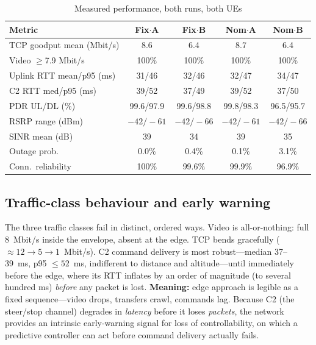 \documentclass[10pt, conference]{IEEEtran}
\begin{document}
\begin{table}[t]
\caption{Measured performance, both runs, both UEs}
\label{tab:metrics}
\centering
\footnotesize
\begin{tabular}{|l|c|c|c|c|}
\hline
\textbf{Metric} & \textbf{Fix$\cdot$A} & \textbf{Fix$\cdot$B} & \textbf{Nom$\cdot$A} & \textbf{Nom$\cdot$B} \\
\hline
TCP goodput mean (Mbit/s) & 8.6 & 6.4 & 8.7 & 6.4 \\
\hline
Video $\ge$7.9 Mbit/s & 100\% & 100\% & 100\% & 100\% \\
\hline
Uplink RTT mean/p95 (ms) & 31/46 & 32/46 & 32/47 & 34/47 \\
\hline
C2 RTT med/p95 (ms) & 39/52 & 37/49 & 39/52 & 37/50 \\
\hline
PDR UL/DL (\%) & 99.6/97.9 & 99.6/98.8 & 99.8/98.3 & 96.5/95.7 \\
\hline
RSRP range (dBm) & $-42/-61$ & $-42/-66$ & $-42/-61$ & $-42/-66$ \\
\hline
SINR mean (dB) & 39 & 34 & 39 & 35 \\
\hline
Outage prob. & 0.0\% & 0.4\% & 0.1\% & 3.1\% \\
\hline
Conn.\ reliability & 100\% & 99.6\% & 99.9\% & 96.9\% \\
\hline
\end{tabular}
\end{table}

\subsection{Traffic-class behaviour and early warning}
The three traffic classes fail in distinct, ordered ways. Video is all-or-nothing: full 8~Mbit/s inside the envelope, absent at the edge. TCP bends gracefully ($\approx12\rightarrow5\rightarrow1$~Mbit/s). C2 command delivery is most robust---median 37--39~ms, p95 $\le52$~ms, indifferent to distance and altitude---until immediately before the edge, where its RTT inflates by an order of magnitude (to several hundred ms) \emph{before} any packet is lost. \textbf{Meaning:} edge approach is legible as a fixed sequence---video drops, transfers crawl, commands lag. Because C2 (the steer/stop channel) degrades in \emph{latency} before it loses \emph{packets}, the network provides an intrinsic early-warning signal for loss of controllability, on which a predictive controller can act before command delivery actually fails.
\end{document}
